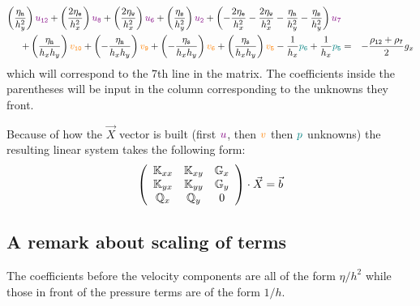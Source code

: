 \begin{eqnarray}
\left( \frac{\eta_{\tt n}}{h_y^2} \right) {\color{violet} u_{\tt 12}} + 
\left( \frac{2\eta_{\tt e}}{h_x^2} \right) {\color{violet} u_{\tt 8}} + 
\left( \frac{2\eta_{\tt w}}{h_x^2} \right) {\color{violet} u_{\tt 6}} + 
\left( \frac{\eta_{\tt s}}{h_y^2} \right) {\color{violet} u_{\tt 2}} + 
\left( -\frac{2\eta_{\tt e}}{h_x^2} -\frac{2\eta_{\tt w}}{h_x^2}  
-\frac{\eta_{\tt n}}{h_y^2} -\frac{\eta_{\tt s}}{h_y^2}  
\right) {\color{violet} u_7} \nonumber\\
+
\left( \frac{\eta_{\tt n}}{h_x h_y} \right) {\color{orange} v_{\tt 10}}+ 
\left(-\frac{\eta_{\tt n}}{h_x h_y} \right) {\color{orange} v_{\tt 9}}+ 
\left(-\frac{\eta_{\tt s}}{h_x h_y} \right) {\color{orange} v_{\tt 6}}+ 
\left( \frac{\eta_{\tt s}}{h_x h_y} \right) {\color{orange} v_{\tt 5}} 
- \frac{1}{h_x} {\color{teal}p_{\tt 6}} + \frac{1}{h_x} {\color{teal}p_{\tt 5}} 
&=& -\frac{\rho_{\tt 12}+\rho_{\tt 7}}{2} g_x \nonumber
\end{eqnarray}
which will correspond to the 7th line in the matrix. The coefficients inside the 
parentheses will be input in the column corresponding to the unknowns they front. 



Because of how the $\vec{X}$ vector is built (first ${\color{violet} u}$, 
then ${\color{orange}v}$ then ${\color{teal} p}$ unknowns)
the resulting linear system takes the following form:
\begin{equation}
\left(
\begin{array}{ccc}
{\mathbb{K}}_{xx} & {\mathbb{K}}_{xy} & {\mathbb{G}}_x \\
{\mathbb{K}}_{yx} & {\mathbb{K}}_{yy} & {\mathbb{G}}_y \\
{\mathbb{Q}}_x & {\mathbb{Q}}_y & 0
\end{array}
\right)
\cdot
\vec{X}
=\vec{b}
\label{eq:fdmstokes6}
\end{equation}











\subsection{A remark about scaling of terms}

The coefficients before the velocity components are all of the form 
$\eta/h^2$ while those in front of the pressure terms are of the form 
$1/h$. 

